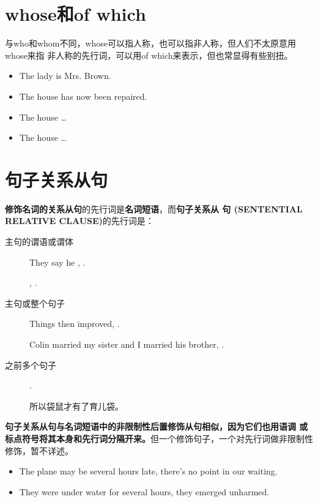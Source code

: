 \section{whose和of which}

与who和whom不同，whose可以指人称，也可以指非人称，但人们不太原意用whose来指
非人称的先行词，可以用of which来表示，但也常显得有些别扭。
\begin{itemize}
\item The lady  is Mrs. Brown.
\item The house  has now been repaired.
\item The house  \ldots{}
\item The house   \ldots{}
\end{itemize}

\section{句子关系从句}

\textbf{修饰名词的关系从句}的先行词是\textbf{名词短语}，而\textbf{句子关系从
  句 (SENTENTIAL RELATIVE CLAUSE)}的先行词是：
\begin{description}
\item[主句的谓语或谓体] They say he , .

  , .

\item[主句或整个句子] Things then improved, .

  Colin married my sister and I married his brother, .

\item[之前多个句子] .

  所以袋鼠才有了育儿袋。
\end{description}

\textbf{句子关系从句与名词短语中的非限制性后置修饰从句相似，因为它们也用语调
  或标点符号将其本身和先行词分隔开来。}但一个修饰句子，一个对先行词做非限制性
修饰，暂不详述。
\begin{itemize}
\item The plane may be several hours late,  there's no point in our waiting.

\item They were under water for several hours,  they
  emerged unharmed.
\end{itemize}

